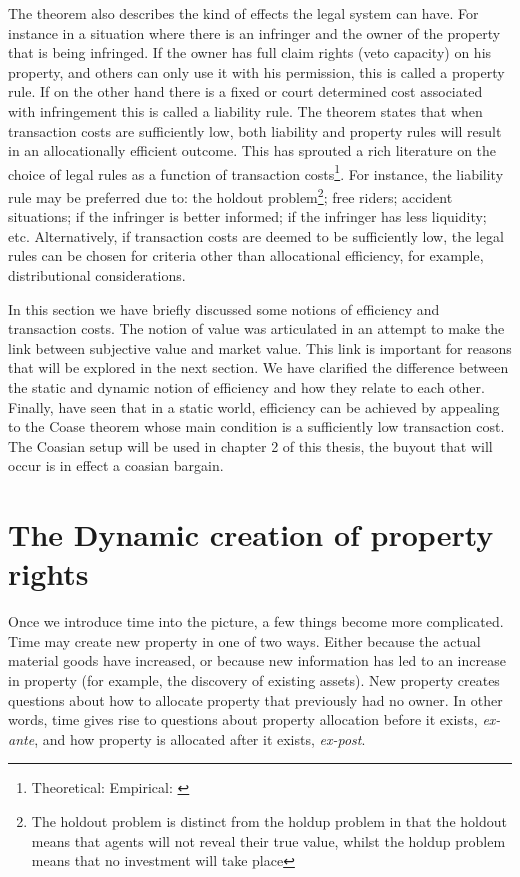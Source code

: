 The theorem also describes the kind of effects the legal system can have. For instance in a situation where there is an infringer and the owner of the property that is being infringed. If the owner has full claim rights (veto capacity) on his property, and others can only use it with his permission, this is called a property rule. If on the other hand there is a fixed or court determined cost associated with infringement this is called a liability rule. The theorem states that when transaction costs are sufficiently low, both liability and property rules will result in an allocationally efficient outcome. This has sprouted a rich literature on the choice of legal rules as a function of transaction costs\footnote{Theoretical: \cite{calabresi1972property} Empirical: \cite{kaplow1995property}}. For instance, the liability rule may be preferred due to: the holdout problem\footnote{The holdout problem is distinct from the holdup problem in that the holdout means that agents will not reveal their true value, whilst the holdup problem means that no investment will take place}; free riders; accident situations; if the infringer is better informed; if the infringer has less liquidity; etc. Alternatively, if transaction costs are deemed to be sufficiently low, the legal rules can be chosen for criteria other than allocational efficiency, for example, distributional considerations.

In this section we have briefly discussed some notions of efficiency and transaction costs. The notion of value was articulated in an attempt to make the link between subjective value and market value. This link is important for reasons that will be explored in the next section. We have clarified the difference between the static and dynamic notion of efficiency and how they relate to each other. Finally, have seen that in a static world, efficiency can be achieved by appealing to the Coase theorem whose main condition is a sufficiently low transaction cost. The Coasian setup will be used in chapter 2 of this thesis, the buyout that will occur is in effect a coasian bargain. 

\newpage

\section{The Dynamic creation of property rights}\label{dynamic}

Once we introduce time into the picture, a few things become more complicated. Time may create new property in one of two ways. Either because the actual material goods have increased, or because new information has led to an increase in property (for example, the discovery of existing assets). New property creates questions about how to allocate property that previously had no owner. In other words, time gives rise to questions about property allocation before it exists, \textit{ex-ante}, and how property is allocated after it exists, \textit{ex-post}.

